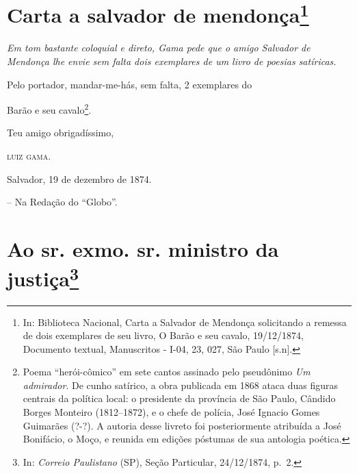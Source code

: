 \chapter{Carta a salvador de mendonça\footnote{ In: Biblioteca Nacional, Carta a Salvador de Mendonça
  solicitando a remessa de dois exemplares de seu livro, O Barão e seu
  cavalo, 19/12/1874, Documento textual, Manuscritos - I-04, 23, 027,
  São Paulo {[}s.n{]}.}} %

\begin{didascalia}
\emph{Em tom bastante coloquial e direto, Gama pede que o amigo Salvador
de Mendonça lhe envie sem falta dois exemplares de um livro de poesias
satíricas.}
\end{didascalia}

\asterisc{}

Pelo portador, mandar-me-hás, {sem falta}, 2 exemplares do

Barão e seu cavalo\footnote{ Poema ``herói-cômico'' em sete cantos
  assinado pelo pseudônimo \emph{Um admirador}. De cunho satírico, a
  obra publicada em 1868 ataca duas figuras centrais da política local:
  o presidente da província de São Paulo, Cândido Borges Monteiro
  (1812--1872), e o chefe de polícia, José Ignacio Gomes Guimarães (?-?).
  A autoria desse livreto foi posteriormente atribuída a José Bonifácio,
  o Moço, e reunida em edições póstumas de sua antologia poética.}.

Teu amigo obrigadíssimo,
\begin{flushright}
\textsc{luiz gama.}

Salvador, 19 de dezembro de 1874.
\end{flushright}

-- Na Redação do ``Globo''.

\chapter{Ao sr. exmo. sr. ministro da justiça\footnote{ In: \emph{Correio Paulistano} (SP), Seção Particular,
  24/12/1874, p.~2.}} %

